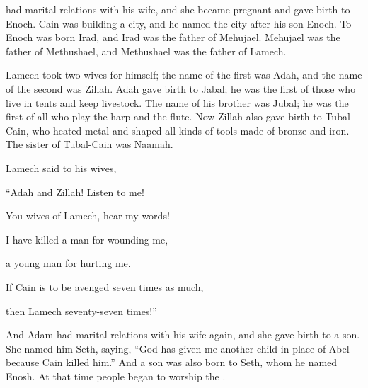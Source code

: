 {had marital relations
with his wife,
and she became pregnant
and gave birth
to Enoch.
Cain was
building
a city,
and he named
the city
after his
son
Enoch.
To Enoch
was born
Irad,
and Irad
was the father
of Mehujael.
Mehujael
was the father
of Methushael,
and Methushael
was the father
of Lamech.
\par }{\PP {}Lamech
took
two
wives
for himself; the name
of the first
was Adah,
and the name
of the second
was Zillah.
Adah
gave birth
to Jabal;
he
was
the first
of those who live in
tents
and keep livestock.
The name
of his brother
was Jubal;
he
was
the first
of all
who play
the harp
and the flute.
Now Zillah
also
gave birth
to Tubal-Cain,
who heated metal and shaped
all
kinds of tools
made of bronze
and iron.
The sister
of Tubal-Cain
was Naamah.
\par }{\PP {}Lamech
said
to his wives,
\par }{\Q “Adah
and Zillah! Listen
to me!
\par }{\Q You wives
of Lamech,
hear
my words!
\par }{\Q I have killed
a man
for
wounding
me,
\par }{\Q a young man
for hurting me.
\par }{\Q {}If
Cain
is to be avenged
seven times
as much,
\par }{\Q then Lamech
seventy-seven times!”
\par }{\PP {}And Adam
had marital relations
with his wife
again,
and she gave birth
to a son.
She
named
him Seth,
saying, “God
has given me another
child
in place
of Abel
because
Cain
killed him.”
And a son
was also
born
to Seth,
whom he named
Enosh.
At that time
people began
to worship
the {}.

}
